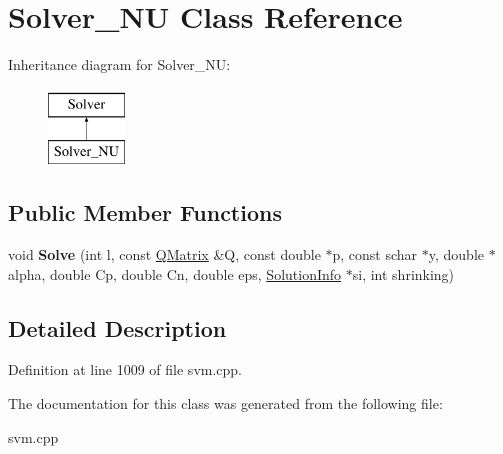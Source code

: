 \hypertarget{class_solver___n_u}{
\section{Solver\_\-NU Class Reference}
\label{class_solver___n_u}
}
Inheritance diagram for Solver\_\-NU:\begin{figure}[H]
\begin{center}
\leavevmode
\includegraphics[height=2cm]{class_solver___n_u}
\end{center}
\end{figure}
\subsection*{Public Member Functions}
\begin{DoxyCompactItemize}
\item 
\hypertarget{class_solver___n_u_a3852f49023c0032934508156d7a9f132}{
void {\bfseries Solve} (int l, const \hyperlink{class_q_matrix}{QMatrix} \&Q, const double $\ast$p, const schar $\ast$y, double $\ast$alpha, double Cp, double Cn, double eps, \hyperlink{struct_solver_1_1_solution_info}{SolutionInfo} $\ast$si, int shrinking)}
\label{class_solver___n_u_a3852f49023c0032934508156d7a9f132}

\end{DoxyCompactItemize}


\subsection{Detailed Description}


Definition at line 1009 of file svm.cpp.



The documentation for this class was generated from the following file:\begin{DoxyCompactItemize}
\item 
svm.cpp\end{DoxyCompactItemize}
